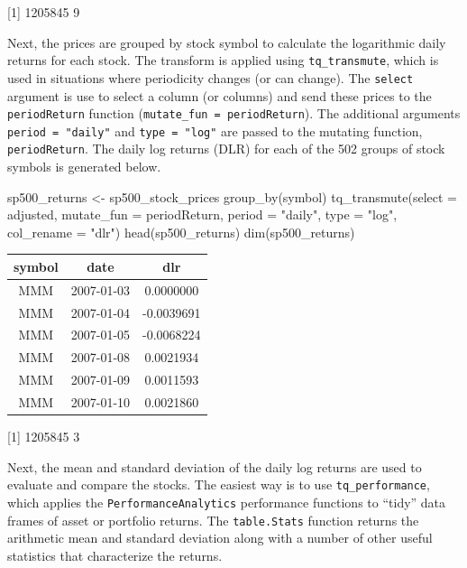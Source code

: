 {[}1{]} 1205845 9

\hspace{20 mm}

Next, the prices are grouped by stock symbol to calculate the
logarithmic daily returns for each stock. The transform is applied using
\texttt{tq\_transmute}, which is used in situations where periodicity
changes (or can change). The \texttt{select} argument is use to select a
column (or columns) and send these prices to the \texttt{periodReturn}
function (\texttt{mutate\_fun\ =\ periodReturn}). The additional
arguments \texttt{period\ =\ "daily"} and \texttt{type\ =\ "log"} are
passed to the mutating function, \texttt{periodReturn}. The daily log
returns (DLR) for each of the 502 groups of stock symbols is generated
below.

\begin{Schunk}
\begin{Sinput}
sp500_returns <- sp500_stock_prices %
    group_by(symbol) %
    tq_transmute(select = adjusted, mutate_fun = periodReturn, 
                 period = "daily", type = "log", col_rename = "dlr")
head(sp500_returns)
dim(sp500_returns)
\end{Sinput}
\end{Schunk}

\begin{tabular}{ccc}
\toprule
symbol & date & dlr\\
\midrule
MMM & 2007-01-03 & 0.0000000\\
MMM & 2007-01-04 & -0.0039691\\
MMM & 2007-01-05 & -0.0068224\\
MMM & 2007-01-08 & 0.0021934\\
MMM & 2007-01-09 & 0.0011593\\
MMM & 2007-01-10 & 0.0021860\\
\bottomrule
\end{tabular}

{[}1{]} 1205845 3

\hspace{20 mm}

Next, the mean and standard deviation of the daily log returns are used
to evaluate and compare the stocks. The easiest way is to use
\texttt{tq\_performance}, which applies the
\texttt{PerformanceAnalytics} performance functions to ``tidy'' data
frames of asset or portfolio returns. The \texttt{table.Stats} function
returns the arithmetic mean and standard deviation along with a number
of other useful statistics that characterize the returns.

